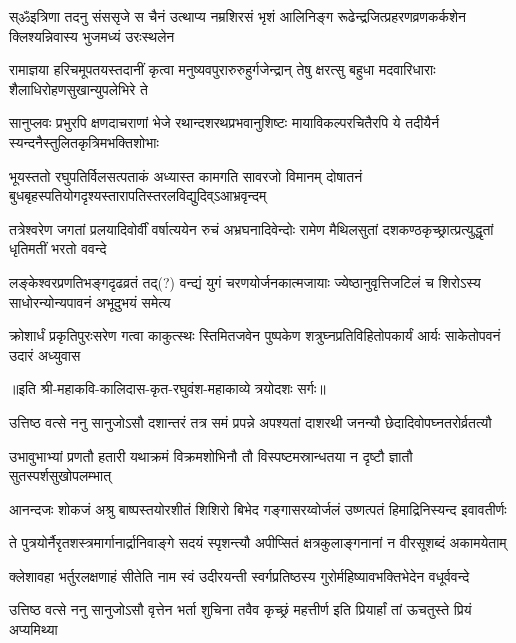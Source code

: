 \twolineshloka
{स्ॐइत्रिणा तदनु संससृजे स चैनं उत्थाप्य नम्रशिरसं भृशं आलिनिङ्ग}
{रूढेन्द्रजित्प्रहरणव्रणकर्कशेन क्लिश्यन्निवास्य भुजमध्यं उरःस्थलेन}%

\twolineshloka
{रामाज्ञया हरिचमूपतयस्तदानीं कृत्वा मनुष्यवपुरारुरुहुर्गजेन्द्रान्}
{तेषु क्षरत्सु बहुधा मदवारिधाराः शैलाधिरोहणसुखान्युपलेभिरे ते}%

\twolineshloka
{सानुप्लवः प्रभुरपि क्षणदाचराणां भेजे रथान्दशरथप्रभवानुशिष्टः}
{मायाविकल्परचितैरपि ये तदीयैर्न स्यन्दनैस्तुलितकृत्रिमभक्तिशोभाः}%

\twolineshloka
{भूयस्ततो रघुपतिर्विलसत्पताकं अध्यास्त कामगति सावरजो विमानम्}
{दोषातनं बुधबृहस्पतियोगदृश्यस्तारापतिस्तरलविद्युदिव्ऽआभ्रवृन्दम्}%

\twolineshloka
{तत्रेश्वरेण जगतां प्रलयादिवोर्वीं वर्षात्ययेन रुचं अभ्रघनादिवेन्दोः}
{रामेण मैथिलसुतां दशकण्ठकृच्छ्रात्प्रत्युद्धृतां धृतिमतीं भरतो ववन्दे}%

\twolineshloka
{लङ्केश्वरप्रणतिभङ्गदृढव्रतं तद्(?) वन्द्यं युगं चरणयोर्जनकात्मजायाः}
{ज्येष्ठानुवृत्तिजटिलं च शिरोऽस्य साधोरन्योन्यपावनं अभूदुभयं समेत्य}%

\twolineshloka
{क्रोशार्धं प्रकृतिपुरःसरेण गत्वा काकुत्स्थः स्तिमितजवेन पुष्पकेण}
{शत्रुघ्नप्रतिविहितोपकार्यं आर्यः साकेतोपवनं उदारं अध्युवास}%

॥इति श्री-महाकवि-कालिदास-कृत-रघुवंश-महाकाव्ये त्रयोदशः सर्गः॥


\twolineshloka
{उत्तिष्ठ वत्से ननु सानुजोऽसौ दशान्तरं तत्र समं प्रपन्ने}
{अपश्यतां दाशरथी जनन्यौ छेदादिवोपघ्नतरोर्व्रतत्यौ}%

\twolineshloka
{उभावुभाभ्यां प्रणतौ हतारी यथाक्रमं विक्रमशोभिनौ तौ}
{विस्पष्टमस्रान्धतया न दृष्टौ ज्ञातौ सुतस्पर्शसुखोपलम्भात्}%

\twolineshloka
{आनन्दजः शोकजं अश्रु बाष्पस्तयोरशीतं शिशिरो बिभेद}
{गङ्गासरय्वोर्जलं उष्णत्पतं हिमाद्रिनिस्यन्द इवावतीर्णः}%

\twolineshloka
{ते पुत्रयोर्नैरृतशस्त्रमार्गानार्द्रानिवाङ्गे सदयं स्पृशन्त्यौ}
{अपीप्सितं क्षत्रकुलाङ्गनानां न वीरसूशब्दं अकामयेताम्}%

\twolineshloka
{क्लेशावहा भर्तुरलक्षणाहं सीतेति नाम स्वं उदीरयन्ती}
{स्वर्गप्रतिष्ठस्य गुरोर्महिष्यावभक्तिभेदेन वधूर्ववन्दे}%

\twolineshloka
{उत्तिष्ठ वत्से ननु सानुजोऽसौ वृत्तेन भर्ता शुचिना तवैव}
{कृच्छ्रं महत्तीर्ण इति प्रियार्हां तां ऊचतुस्ते प्रियं अप्यमिथ्या}%

